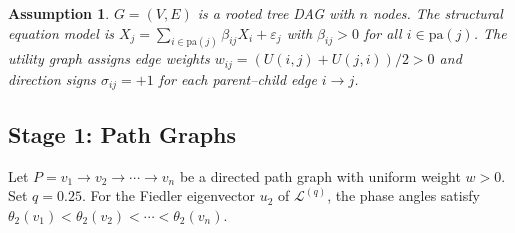 \documentclass[twoside,11pt]{article}
\newtheorem{assumption}[theorem]{Assumption}
\begin{document}
\begin{assumption}
\label{asm:tree-dag}
$G=(V,E)$ is a rooted tree DAG with $n$ nodes.  The structural equation
model is $X_j=\sum_{i\in\mathrm{pa}(j)}\beta_{ij}X_i+\varepsilon_j$
with $\beta_{ij}>0$ for all $i\in\mathrm{pa}(j)$.  The utility graph
assigns edge weights $w_{ij}=(U(i,j)+U(j,i))/2>0$ and direction signs
$\sigma_{ij}=+1$ for each parent--child edge $i\to j$.
\end{assumption}

\subsection{Stage 1: Path Graphs}

\begin{lemma}
\label{lem:path-phase}
Let $P=v_1\to v_2\to\cdots\to v_n$ be a directed path graph with
uniform weight $w>0$.  Set $q=0.25$.  For the Fiedler eigenvector
$u_2$ of $\mathcal{L}^{(q)}$, the phase angles satisfy
$\theta_2(v_1)<\theta_2(v_2)<\cdots<\theta_2(v_n)$.
\end{lemma}
\end{document}
